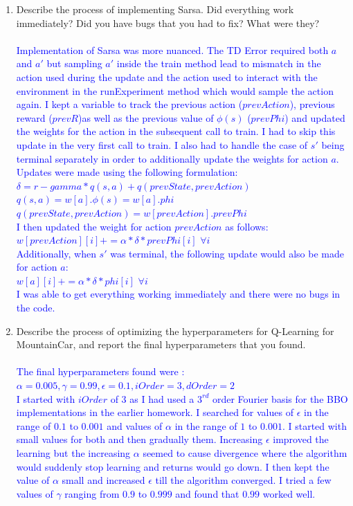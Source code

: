 \documentclass[]{article}
\begin{document}
\begin{enumerate}
    \item Describe the process of implementing Sarsa. Did everything work immediately? Did you have bugs that you had to fix? What were they?
    \\\\
    \textcolor{blue}{
    	Implementation of Sarsa was more nuanced. The TD Error required both $a$ and $a'$ but sampling $a'$ inside the train method lead to mismatch in the action used during the update and the action used to interact with the environment in the runExperiment method which would sample the action again. I kept a variable to track the previous action ($prevAction$), previous reward ($prevR$)as well as the previous value of $\phi(s)$ ($prevPhi$) and updated the weights for the action in the subsequent call to train. I had to skip this update in the very first call to train. I also had to handle the case of $s'$ being terminal separately in order to additionally update the weights for action $a$. Updates were made using the following formulation:\\
    	$\delta = r - gamma*q(s,a) + q(prevState,prevAction)$\\
    	$q(s,a) = w[a].\phi(s) = w[a].phi $\\
    	$q(prevState,prevAction) = w[prevAction] . prevPhi$\\
    	I then updated the weight for action $prevAction$ as follows:\\
    	$w[prevAction][i] += \alpha*\delta*prevPhi[i]$ $\forall i $\\
    	Additionally, when $s'$ was terminal, the following update would also be made for action $a$:\\
    	$w[a][i] += \alpha*\delta*phi[i]$ $\forall i $\\
       	I was able to get everything working immediately and there were no bugs in the code.
    }

    \item Describe the process of optimizing the hyperparameters for Q-Learning for MountainCar, and report the final hyperparameters that you found.
    \\\\
    \textcolor{blue}{
    	The final hyperparameters found were :\\
    	$
    	\alpha  = 0.005,
    	\gamma = 0.99,
    	\epsilon = 0.1,
    	iOrder = 3,
    	dOrder = 2
    	$\\
    	I started with $iOrder$ of 3 as I had used a $3^{rd}$ order Fourier basis for the BBO implementations in the earlier homework. I searched for values of $\epsilon$ in the range of $0.1$ to $0.001$ and values of $\alpha$ in the range of $1$ to $0.001$.  I started with small values for both and then gradually them. Increasing $\epsilon$ improved the learning but the increasing $\alpha$ seemed to cause divergence where the algorithm would suddenly stop learning and returns would go down. I then kept the value of $\alpha$ small and increased $\epsilon$ till the algorithm converged. I tried a few values of $\gamma$ ranging from $0.9$ to $0.999$ and found that $0.99$ worked well.
    }


\end{enumerate}
\end{document}
